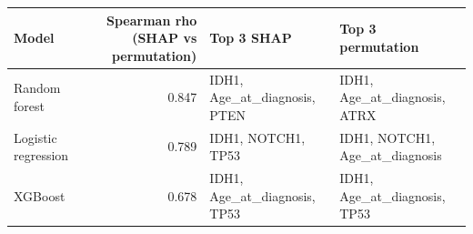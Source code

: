 \begin{tabular}{lrll}
\toprule
\textbf{Model} & \textbf{Spearman rho (SHAP vs permutation)} & \textbf{Top 3 SHAP} & \textbf{Top 3 permutation} \\
\midrule
Random forest & 0.847 & IDH1, Age\_at\_diagnosis, PTEN & IDH1, Age\_at\_diagnosis, ATRX \\
Logistic regression & 0.789 & IDH1, NOTCH1, TP53 & IDH1, NOTCH1, Age\_at\_diagnosis \\
XGBoost & 0.678 & IDH1, Age\_at\_diagnosis, TP53 & IDH1, Age\_at\_diagnosis, TP53 \\
\bottomrule
\end{tabular}
